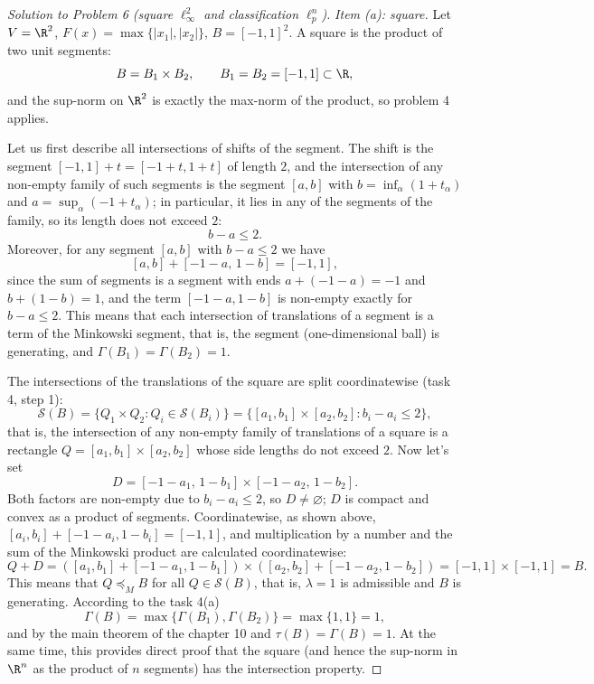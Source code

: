 \documentclass[a4paper,12pt]{report}
\begin{document}
\begin{proof}[Solution to Problem \textup{6} \textup{(}square $\ell_\infty^2$ and classification $\ell_p^n$\textup{)}]

\textit{Item \textup{(a)}\textup{:} square.} Let $V=\R^2$, $F(x)=\max\{|x_1|,|x_2|\}$, $B=[-1,1]^2$. A square is the product of two unit segments\textup{:}
\[
B=B_1\times B_2,\qquad B_1=B_2=[-1,1]\subset\R,
\]
and the sup-norm on $\R^2$ is exactly the max-norm of the product, so problem \textup{4} applies.

Let us first describe all intersections of shifts of the segment. The shift is the segment $[-1,1]+t=[-1+t,1+t]$ of length $2$, and the intersection of any non-empty family of such segments is the segment $[a,b]$ with $b=\inf_\alpha(1+t_\alpha)$ and $a=\sup_\alpha(-1+t_\alpha)$; in particular, it lies in any of the segments of the family, so its length does not exceed $2$\textup{:}
\[
b-a\le2 .
\]
Moreover, for any segment $[a,b]$ with $b-a\le2$ we have
\[
[a,b]+[-1-a,\,1-b]=[-1,1],
\]
since the sum of segments is a segment with ends $a+(-1-a)=-1$ and $b+(1-b)=1$, and the term $[-1-a,1-b]$ is non-empty exactly for $b-a\le2$. This means that each intersection of translations of a segment is a term of the Minkowski segment, that is, the segment \textup{(}one-dimensional ball\textup{)} is generating, and $\Gamma(B_1)=\Gamma(B_2)=1$.

The intersections of the translations of the square are split coordinatewise \textup{(}task \textup{4}, step \textup{1}\textup{)}:
\[
\mathcal S(B)=\{Q_1\times Q_2: Q_i\in\mathcal S(B_i)\}=\bigl\{[a_1,b_1]\times[a_2,b_2]: b_i-a_i\le2\bigr\},
\]
that is, the intersection of any non-empty family of translations of a square is a rectangle $Q=[a_1,b_1]\times[a_2,b_2]$ whose side lengths do not exceed $2$. Now let's set
\[
D=[-1-a_1,\,1-b_1]\times[-1-a_2,\,1-b_2].
\]
Both factors are non-empty due to $b_i-a_i\le2$, so $D\ne\varnothing$; $D$ is compact and convex as a product of segments. Coordinatewise\textup{,} as shown above, $[a_i,b_i]+[-1-a_i,1-b_i]=[-1,1]$, and multiplication by a number and the sum of the Minkowski product are calculated coordinatewise\textup{:}
\[
Q+D=([a_1,b_1]+[-1-a_1,1-b_1])\times([a_2,b_2]+[-1-a_2,1-b_2])=[-1,1]\times[-1,1]=B .
\]
This means that $Q\preceq_M B$ for all $Q\in\mathcal S(B)$, that is, $\lambda=1$ is admissible and $B$ is generating. According to the task \textup{4}\textup{(a)}
\[
\Gamma(B)=\max\{\Gamma(B_1),\Gamma(B_2)\}=\max\{1,1\}=1,
\]
and by the main theorem of the chapter \textup{10} and $\tau(B)=\Gamma(B)=1$. At the same time, this provides direct proof that the square \textup{(}and hence the sup-norm in $\R^n$ as the product of $n$ segments\textup{)} has the intersection property.


\end{proof}
\end{document}
